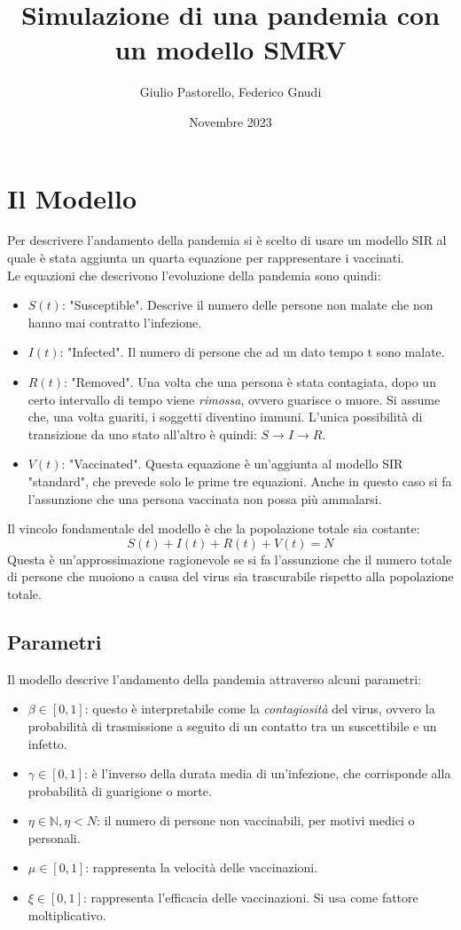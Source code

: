 \documentclass{article}
\title{Simulazione di una pandemia con un modello SMRV}
\author{Giulio Pastorello, Federico Gnudi}
\date{Novembre 2023}
\begin{document}
\maketitle

\section{Il Modello}

\hspace{\parindent} Per descrivere l'andamento della pandemia si è scelto 
di usare un modello SIR al quale è stata aggiunta un quarta 
equazione per rappresentare i vaccinati.\\
Le equazioni che descrivono l'evoluzione della pandemia sono quindi:
\begin{itemize}
\item $S(t)$: "Susceptible". Descrive il numero delle persone non 
malate che non hanno mai contratto l'infezione.
\item $I(t)$: "Infected". Il numero di persone che ad un dato tempo 
t sono malate. 
\item $R(t)$: "Removed". Una volta che una persona è stata 
contagiata, dopo un certo intervallo di tempo viene \textit{rimossa}, 
ovvero guarisce o muore. Si assume che, una volta guariti, 
i soggetti diventino immuni. L'unica possibilità di transizione da 
uno stato all'altro è quindi: $S\xrightarrow{}I\xrightarrow{}R$.
\item $V(t)$: "Vaccinated". Questa equazione è un'aggiunta al modello 
SIR "standard", che prevede solo le prime tre equazioni. 
Anche in questo caso si fa l'assunzione che una persona vaccinata 
non possa più ammalarsi.
\end{itemize}
Il vincolo fondamentale del modello è che la popolazione totale 
sia costante:
\begin{equation}\label{eq::pop}
S(t)+I(t)+R(t)+V(t)=N
\end{equation}
Questa è un'approssimazione ragionevole se si fa l'assunzione 
che il numero totale di persone che muoiono a causa del virus 
sia trascurabile rispetto alla popolazione totale. 
\subsection{Parametri}
Il modello descrive l'andamento della pandemia attraverso alcuni 
parametri:
\begin{itemize} 
\item $\beta \in [0,1]$: questo è interpretabile come la 
\textit{contagiosità} del virus, ovvero la probabilità di 
trasmissione a seguito di un contatto tra un suscettibile e un infetto.
\item $\gamma \in [0,1]$: è l'inverso della durata media di 
un'infezione, che corrisponde alla probabilità di guarigione o morte.
\item $\eta \in \mathbb{N}, \eta < N$: il numero di persone non 
vaccinabili, per motivi medici o personali.
\item $\mu \in [0,1]$: rappresenta la velocità delle vaccinazioni.
\item $\xi \in [0,1]$: rappresenta l'efficacia delle vaccinazioni. 
Si usa come fattore moltiplicativo.
\end{itemize}
\end{document}
